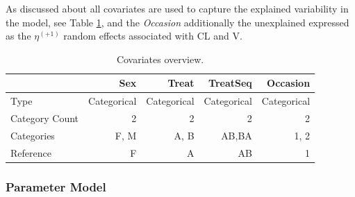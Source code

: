 As discussed about all covariates are used to capture the explained variability in the model, 
see Table \ref{tab:CovariatesOverview}, and the \emph{Occasion} additionally
the unexplained expressed as the $\eta^{(+1)}$ random effects associated with CL and V.

\begin{table}[h]
\begin{center}
\begin{tabular}{lrrrr}\toprule
 & \textbf{Sex} &{\color{red}\textbf{Treat}}&{\color{mediumgreen}\textbf{TreatSeq}}&{\color{magenta}\textbf{Occasion}}\\\midrule
Type & Categorical & Categorical & Categorical & Categorical  \\
Category Count & 2 & 2 & 2 & 2\\
Categories & F, M & A, B & AB,BA & 1, 2\\
Reference & F & A & AB & 1\\
\bottomrule
\end{tabular}
\end{center}
\caption{Covariates overview.}
\label{tab:CovariatesOverview}
\end{table}

\subsubsection{Parameter Model}

